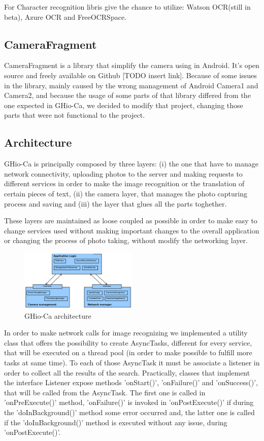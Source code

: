 For Character recognition libris give the chance to utilize: Watson OCR(still in 
beta), Azure OCR and FreeOCRSpace.

\subsection{CameraFragment}
CameraFragment is a library that simplify the camera using in Android. It's 
open source and freely available on Github [TODO insert link]. Because of some
issues in the library, mainly caused by the wrong management of Android Camera1 
and Camera2, and because the usage of some parts of that library differed from 
the one expected in GHio-Ca, we decided to modify that project, changing those 
parts that were not functional to the project.

\subsection{Architecture}
GHio-Ca is principally composed by three layers: (i) the one that have to manage
network connectivity, uploading photos to the server and making requests to 
different services in order to make the image recognition or the translation of 
certain pieces of text, (ii) the camera layer, that manages the photo 
capturing process and saving and (iii) the layer that glues all the parts 
toghether. 

These layers are maintained as loose coupled as possible in order to make 
easy to change services used without making important changes to the overall 
application or changing the process of photo taking, without modify the 
networking layer.

\begin{figure}[h]
    \centering
    \includegraphics[width=0.50\textwidth]{../img/ghioca_macro_component}
    \caption{GHio-Ca architecture}
    \label{fig:architecture}
\end{figure}

In order to make network calls for image recognizing we implemented a utility 
class that offers the possibility to create AsyncTasks, different for every 
service, that will be executed on a thread pool (in order to make possible to 
fulfill more tasks at same time). To each of those AsyncTask it must be associate 
a listener in order to collect all the results of the search. Practically, 
classes that implement the interface Listener expose methods 'onStart()', 
'onFailure()' and 'onSuccess()', that will be called from the AsyncTask. The 
first one is called in 'onPreExecute()' method, 'onFailure()' is invoked in 
'onPostExecute()' if during the 'doInBackground()' method some error occurred 
and, the latter one is called if the 'doInBackground()' method is executed 
without any issue, during 'onPostExecute()'.

